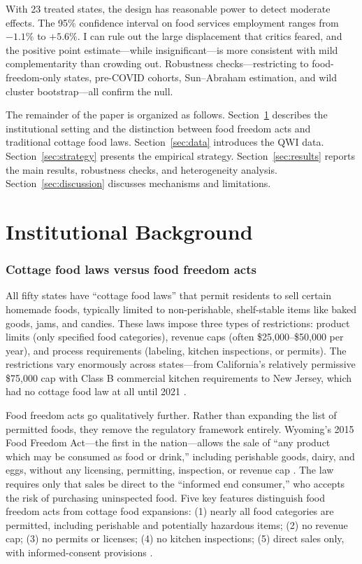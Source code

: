 \documentclass[12pt]{article}
\begin{document}
With 23 treated states, the design has reasonable power to detect moderate effects. The 95\% confidence interval on food services employment ranges from $-1.1\%$ to $+5.6\%$. I can rule out the large displacement that critics feared, and the positive point estimate---while insignificant---is more consistent with mild complementarity than crowding out. Robustness checks---restricting to food-freedom-only states, pre-COVID cohorts, Sun--Abraham estimation, and wild cluster bootstrap---all confirm the null.

The remainder of the paper is organized as follows. Section~\ref{sec:background} describes the institutional setting and the distinction between food freedom acts and traditional cottage food laws. Section~\ref{sec:data} introduces the QWI data. Section~\ref{sec:strategy} presents the empirical strategy. Section~\ref{sec:results} reports the main results, robustness checks, and heterogeneity analysis. Section~\ref{sec:discussion} discusses mechanisms and limitations.

\section{Institutional Background}
\label{sec:background}

\subsubsection*{Cottage food laws versus food freedom acts} All fifty states have ``cottage food laws'' that permit residents to sell certain homemade foods, typically limited to non-perishable, shelf-stable items like baked goods, jams, and candies. These laws impose three types of restrictions: product limits (only specified food categories), revenue caps (often \$25,000--\$50,000 per year), and process requirements (labeling, kitchen inspections, or permits). The restrictions vary enormously across states---from California's relatively permissive \$75,000 cap with Class B commercial kitchen requirements to New Jersey, which had no cottage food law at all until 2021 \citep{forrager2024}.

Food freedom acts go qualitatively further. Rather than expanding the list of permitted foods, they remove the regulatory framework entirely. Wyoming's 2015 Food Freedom Act---the first in the nation---allows the sale of ``any product which may be consumed as food or drink,'' including perishable goods, dairy, and eggs, without any licensing, permitting, inspection, or revenue cap \citep{wyoming2015}. The law requires only that sales be direct to the ``informed end consumer,'' who accepts the risk of purchasing uninspected food. Five key features distinguish food freedom acts from cottage food expansions: (1) nearly all food categories are permitted, including perishable and potentially hazardous items; (2) no revenue cap; (3) no permits or licenses; (4) no kitchen inspections; (5) direct sales only, with informed-consent provisions \citep{neha2023}.
\end{document}
